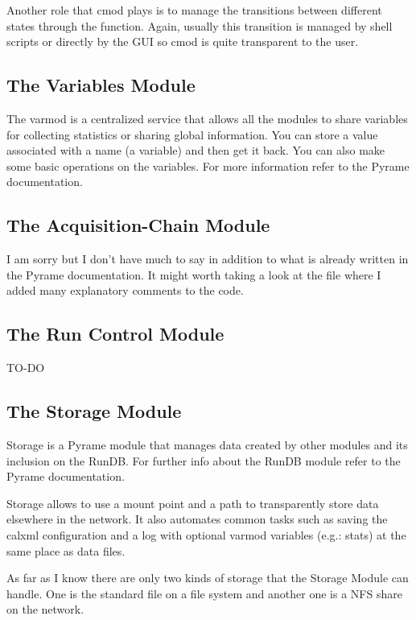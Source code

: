 Another role that cmod plays is to manage the transitions between
different states through the 
function. Again, usually this transition is managed by shell scripts
or directly by the GUI so cmod is quite transparent to the user.

\subsection{The Variables Module}
\label{sec:VARMOD}

The varmod is a centralized service that allows all the modules to
share variables for collecting statistics or sharing global
information. You can store a value associated with a name (a variable)
and then get it back. You can also make some basic operations on the
variables. For more information refer to the Pyrame documentation.

\subsection{The Acquisition-Chain Module}
\label{sec:ACQ}
I am sorry but I don't have much to say in addition to what is already
written in the Pyrame documentation. It might worth taking a look at
the  file where I added many explanatory comments to the
code.

\subsection{The Run Control Module}
\label{sec:RC}

TO-DO

\subsection{The Storage Module}
\label{sec:STORAGE}

Storage is a Pyrame module that manages data created by other modules
and its inclusion on the RunDB. For further info about the RunDB
module refer to the Pyrame documentation.

Storage allows to use a mount point and a path to transparently store
data elsewhere in the network. It also automates common tasks such as
saving the calxml configuration and a log with optional varmod
variables (e.g.: stats) at the same place as data files.

As far as I know there are only two kinds of storage that the Storage
Module can handle. One is the standard file on a file system and
another one is a NFS share on the network.

